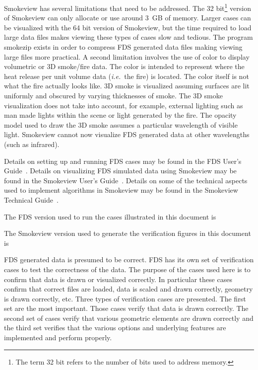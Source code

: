 \documentclass[11pt,twoside]{book}
\begin{document}
Smokeview has several limitations that need to be addressed.  The
32 bit\footnote{The term 32 bit refers to the number of bits used
to address memory.} version of Smokeview can only allocate or use
around 3~GB of memory.  Larger cases can be visualized with the 64
bit version of Smokeview, but the time required to load large data
files makes viewing these types of cases slow and tedious.  The
program smokezip exists in order to compress FDS generated data
files making viewing large files more practical.  A second
limitation involves the use of color to display volumetric or 3D
smoke/fire data.  The color is intended to represent where the
heat release per unit volume data ({\em i.e.}\ the fire) is located.
The color itself is not what the fire actually looks like.  3D
smoke is visualized assuming surfaces are lit uniformly and
obscured by varying thicknesses of smoke.  The 3D smoke
visualization does not take into account, for example, external
lighting such as man made lights within the scene or light
generated by the fire.  The opacity model used to draw the 3D
smoke assumes a particular wavelength of visible light. Smokeview
cannot now visualize FDS generated data at other wavelengths (such
as infrared).

Details on setting up and running FDS cases may be found in the
FDS User's Guide~\cite{FDS_Users_Guide}.  Details on visualizing
FDS simulated data using Smokeview may be found in the Smokeview
User's Guide~\cite{Smokeview_Users_Guide}.  Details on some of the
technical aspects used to implement algorithms in Smokeview may be
found in the Smokeview Technical
Guide~\cite{Smokeview_Tech_Guide}.

The FDS version used to run the cases illustrated  in this document
is
{

}

The Smokeview version used to generate the verification figures in this document is
{

}

FDS generated data is presumed to be correct.  FDS has its own set
of verification cases to test the correctness of the data. The
purpose of the cases used here is to confirm that data is drawn or
visualized correctly. In particular these cases confirm that
correct files are loaded, data is scaled and drawn correctly,
geometry is drawn correctly, etc.   Three types of verification
cases are presented. The first set are the most important. Those
cases verify that data is drawn correctly.  The second set of
cases verify that various geometric elements are drawn correctly
and the third set verifies that the various options and underlying
features are implemented and perform properly.
\end{document}
